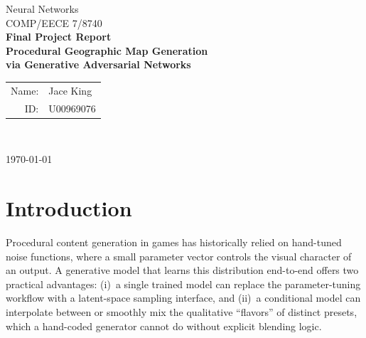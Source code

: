 \documentclass[11pt]{article}
\begin{document}
\begin{titlepage}
  \centering
  \vspace*{1.5cm}
  {\large Neural Networks\\[0.4em]
          COMP/EECE 7/8740 \\[2.5cm]}
  {\LARGE\bfseries Final Project Report\\[0.6em]
   \large Procedural Geographic Map Generation\\[0.3em]
   via Generative Adversarial Networks\\[2.5cm]}
  {\large
   \begin{tabular}{rl}
     Name: & Jace King \\[0.5em]
     ID:   & U00969076  \\
   \end{tabular}\\[2.5cm]}
  {\large \today}
  \vfill
\end{titlepage}

\newpage
\begin{abstract}
\noindent
We train Wasserstein GANs with gradient penalty (WGAN-GP) and a DCGAN-style
convolutional architecture to reproduce the distribution of $128{\times}128$ RGB
terrain maps generated by layered simplex/Perlin noise. Seven generators, one
per hand-tuned noise preset, were trained for 50 epochs each on 3{,}000 images
per class. The unconditional models recover the macro-scale land/water layout
for several presets but fail to reproduce the discrete six-tier terrain palette
and exhibit single-feature mode collapse on three of the seven. A conditional
variant (cDCGAN) over all seven presets simultaneously was attempted but did
not finish within the available compute budget (epoch 14/50 at
$\sim$76\,min/epoch on CPU). We report training curves, qualitative samples, and quantitative evaluation of
all seven generators against the held-out test set using FID, radial
power-spectrum slope, palette color fidelity, and A*-based navigability
metrics. The trained preset\_01 generator is integrated into a real-time A*
navigation game via a NumPy-only inference path with snap-to-palette
post-processing.
\end{abstract}

\section{Introduction}
Procedural content generation in games has historically relied on hand-tuned
noise functions, where a small parameter vector controls the visual character
of an output. A generative model that learns this distribution end-to-end
offers two practical advantages: (i)~a single trained model can replace the
parameter-tuning workflow with a latent-space sampling interface, and
(ii)~a conditional model can interpolate between or smoothly mix the
qualitative ``flavors'' of distinct presets, which a hand-coded generator
cannot do without explicit blending logic.
\end{document}
